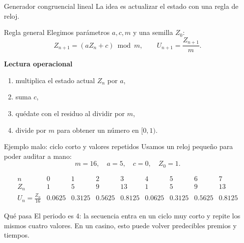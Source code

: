 \documentclass[aspectratio=1610, 9pt]{beamer}
\begin{document}
\begin{frame}{Generador congruencial lineal}
    La idea es actualizar el estado con una regla de reloj.

    \vspace{0.25cm}
    \begin{block}{Regla general}
    Elegimos parámetros $a,c,m$ y una semilla $Z_0$:
    \[
    Z_{n+1} = (aZ_n + c)\bmod m,
    \qquad
    U_{n+1}=\frac{Z_{n+1}}{m}.
    \]
    \end{block}

    \vspace{0.2cm}
    \textbf{Lectura operacional}
    \begin{enumerate}
        \item multiplica el estado actual $Z_n$ por $a$,
        \item suma $c$,
        \item quédate con el residuo al dividir por $m$,
        \item divide por $m$ para obtener un número en $[0,1)$.
    \end{enumerate}
\end{frame}

\begin{frame}{Ejemplo malo: ciclo corto y valores repetidos}
    Usamos un reloj pequeño para poder auditar a mano:
    \[
    m=16,\quad a=5,\quad c=0,\quad Z_0=1.
    \]

    \vspace{0.15cm}
    \[
    \begin{array}{c|cccccccc}
    n & 0 & 1 & 2 & 3 & 4 & 5 & 6 & 7\\ \hline
    Z_n & 1 & 5 & 9 & 13 & 1 & 5 & 9 & 13\\
    U_n=\tfrac{Z_n}{16} & 0.0625 & 0.3125 & 0.5625 & 0.8125 & 0.0625 & 0.3125 & 0.5625 & 0.8125
    \end{array}
    \]

    \vspace{0.25cm}
    \begin{alertblock}{Qué pasa}
    El periodo es 4: la secuencia entra en un ciclo muy corto y repite los mismos cuatro valores.
    En un casino, esto puede volver predecibles premios y tiempos.
    \end{alertblock}
\end{frame}
\end{document}
